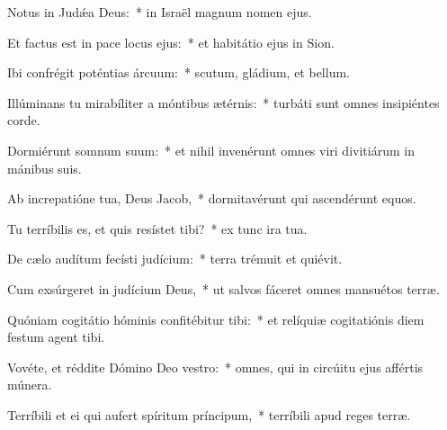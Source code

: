 \item Notus in Judǽa Deus:~* in Israël magnum nomen ejus.

\item Et factus est in pace locus ejus:~* et habitátio ejus in Sion.

\item Ibi confrégit poténtias árcuum:~* scutum, gládium, et bellum.

\item Illúminans tu mirabíliter a móntibus ætérnis:~* turbáti sunt omnes insipiéntes corde.

\item Dormiérunt somnum suum:~* et nihil invenérunt omnes viri divitiárum in mánibus suis.

\item Ab increpatióne tua, Deus Jacob,~* dormitavérunt qui ascendérunt equos.

\item Tu terríbilis es, et quis resístet tibi?~* ex tunc ira tua.

\item De cælo audítum fecísti judícium:~* terra trémuit et quiévit.

\item Cum exsúrgeret in judícium Deus,~* ut salvos fáceret omnes mansuétos terræ.

\item Quóniam cogitátio hóminis confitébitur tibi:~* et relíquiæ cogitatiónis diem festum agent tibi.

\item Vovéte, et réddite Dómino Deo vestro:~* omnes, qui in circúitu ejus affértis múnera.

\item Terríbili et ei qui aufert spíritum príncipum,~* terríbili apud reges terræ.

